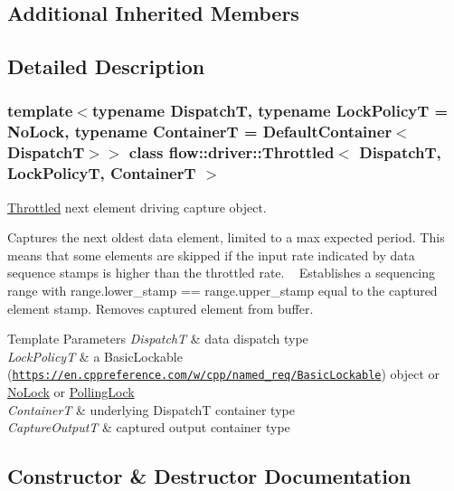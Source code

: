\subsection*{Additional Inherited Members}


\subsection{Detailed Description}
\subsubsection*{template$<$typename DispatchT, typename Lock\+PolicyT = No\+Lock, typename ContainerT = Default\+Container$<$\+Dispatch\+T$>$$>$\newline
class flow\+::driver\+::\+Throttled$<$ Dispatch\+T, Lock\+Policy\+T, Container\+T $>$}

\hyperlink{classflow_1_1driver_1_1_throttled}{Throttled} next element driving capture object. 

Captures the next oldest data element, limited to a max expected period. This means that some elements are skipped if the input rate indicated by data sequence stamps is higher than the throttled rate. ~\newline
 Establishes a sequencing range with {\ttfamily range.\+lower\+\_\+stamp == range.\+upper\+\_\+stamp} equal to the captured element stamp. Removes captured element from buffer.


\begin{DoxyTemplParams}{Template Parameters}
{\em DispatchT} & data dispatch type \\
\hline
{\em Lock\+PolicyT} & a Basic\+Lockable (\href{https://en.cppreference.com/w/cpp/named_req/BasicLockable}{\tt https\+://en.\+cppreference.\+com/w/cpp/named\+\_\+req/\+Basic\+Lockable}) object or \hyperlink{structflow_1_1_no_lock}{No\+Lock} or \hyperlink{structflow_1_1_polling_lock}{Polling\+Lock} \\
\hline
{\em ContainerT} & underlying {\ttfamily DispatchT} container type \\
\hline
{\em Capture\+OutputT} & captured output container type \\
\hline
\end{DoxyTemplParams}


\subsection{Constructor \& Destructor Documentation}
\mbox{\label{classflow_1_1driver_1_1_throttled_a49cd5d051b282ca4145beb4371e94d5d}} 
